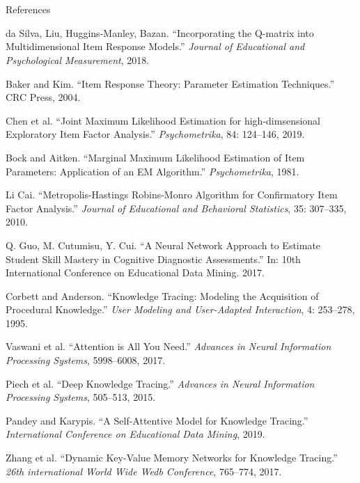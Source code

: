 \documentclass{beamer}
\theoremstyle{definition}
\begin{document}
\section{}
\begin{frame}{References}
\begin{thebibliography}{20}
\tiny


 da Silva, Liu, Huggins-Manley, Bazan. ``Incorporating the Q-matrix into Multidimensional Item Response Models.'' \textit{Journal of Educational and Psychological Measurement}, 2018.

 Baker and Kim. ``Item Response Theory: Parameter Estimation Techniques.'' CRC Press, 2004.

 Chen et al. ``Joint Maximum Likelihood Estimation for high-dimsensional Exploratory Item Factor Analysis.'' \textit{Psychometrika}, 84: 124--146, 2019.

 Bock and Aitken. ``Marginal Maximum Likelihood Estimation of Item Parameters: Application of an EM Algorithm.'' \textit{Psychometrika}, 1981.

 Li Cai. ``Metropolis-Hastings Robins-Monro Algorithm for Confirmatory Item Factor Analysis.'' \textit{Journal of Educational and Behavioral Statistics}, 35: 307--335, 2010.

 Q. Guo, M. Cutumisu, Y. Cui. ``A Neural Network Approach to Estimate Student Skill Mastery in Cognitive Diagnostic Assessments.'' In: 10th International Conference on Educational Data Mining. 2017.

 Corbett and Anderson. ``Knowledge Tracing: Modeling the Acquisition of Procedural Knowledge.'' \textit{User Modeling and User-Adapted Interaction}, 4: 253--278, 1995.

 Vaswani et al. ``Attention is All You Need.'' \textit{Advances in Neural Information Processing Systems}, 5998--6008, 2017.

 Piech et al. ``Deep Knowledge Tracing.'' \textit{Advances in Neural Information Processing Systems}, 505--513, 2015.

 Pandey and Karypis. ``A Self-Attentive Model for Knowledge Tracing.'' \textit{International Conference on Educational Data Mining}, 2019.

 Zhang et al. ``Dynamic Key-Value Memory Networks for Knowledge Tracing.'' \textit{26th international World Wide Wedb Conference}, 765--774, 2017.

\end{thebibliography}
\end{frame}
\end{document}

